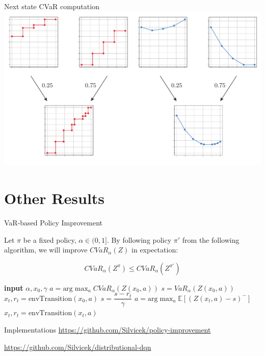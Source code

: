 \documentclass{beamer}
\begin{document}
\begin{frame}{Next state CVaR computation}
\center
\includegraphics[width=\linewidth]{../gfx/multivarvar.pdf}
\end{frame}

\section{Other Results}

\begin{frame}{VaR-based Policy Improvement}
\begin{theorem}
Let $\pi$ be a fixed policy, $\alpha \in (0, 1]$. By following policy $\pi'$ from the following algorithm, we will improve $CVaR_\alpha(Z)$ in expectation:

$$CVaR_\alpha(Z^\pi) \le CVaR_\alpha(Z^{\pi'})$$
\end{theorem}


\begin{algorithmic}
    \STATE \textbf{input} $\alpha, x_0, \gamma$
    \STATE $a = \text{arg}\max_a CVaR_\alpha(Z(x_0, a))$
    \STATE $s = VaR_\alpha(Z(x_0, a))$
    \STATE $x_t, r_t = \text{envTransition}(x_0, a)$
    	\STATE $s = \dfrac{s-r_t}{\gamma}$
    	\STATE $a = \text{arg}\max_a \mathbb{E}\left[(Z(x_t, a)-s)^- \right]$
    	\STATE $x_t, r_t = \text{envTransition}(x_t, a)$
   	\ENDWHILE
\end{algorithmic}

\end{frame}


\begin{frame}{Implementations}
\center
\url{https://github.com/Silvicek/policy-improvement}

\vspace{1cm}

\url{https://github.com/Silvicek/distributional-dqn}

\end{frame}
\end{document}
